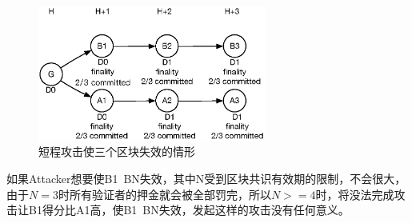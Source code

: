 \begin{figure}[h]
\centering
\includegraphics[width=7.5cm]{./figs/revert3}
\caption{短程攻击使三个区块失效的情形}
\label{fig:revert3}
\end{figure}

如果Attacker想要使B1~BN失效，其中N受到区块共识有效期的限制，不会很大，由于$N=3$时所有验证者的押金就会被全部罚完，所以$N>=4$时，将没法完成攻击让B1得分比A1高，使B1~BN失效，发起这样的攻击没有任何意义。
